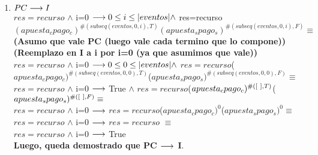 \documentclass[10pt,a4paper]{article}
\begin{document}
\begin{flushleft}
\begin{enumerate} \setlength\itemsep{4mm}
	\item \textbf{$PC \longrightarrow I$} \\
	\vspace{2mm}
	$res= recurso$ $\wedge$ i=0 $\longrightarrow 0\leq i\leq|eventos| \wedge$ res=recurso$(apuesta_cpago_c)^{\#(subseq(eventos,0,i),T)}(apuesta_spago_s)^{\#(subseq(eventos,0,i),F)} \equiv$\\
	\vspace{3mm}
	\textbf{(Asumo que vale PC (luego vale cada termino que lo compone))}\\
	\vspace{3mm}
	\textbf{(Reemplazo en I a i por i=0 (ya que asumimos que vale))}\\
	\vspace{3mm}
	$res= recurso$ $\wedge$ i=0 $\longrightarrow 0\leq 0\leq|eventos| \wedge$ $res=recurso$($apuesta_cpago_c)^{\#(subseq(eventos,0,0),T)}$($apuesta_spago_s)^{\#(subseq(eventos,0,0),F)}\equiv$\\
	\vspace{2mm}
	$res= recurso$ $\wedge$ i=0  $\longrightarrow$  True $ \wedge$ $res=recurso$($apuesta_cpago_c)^{\#([\ ],T)}$($apuesta_spago_s)^{\#([\ ],F)}\equiv$ \\
	\vspace{2mm}
	$res= recurso$ $\wedge$ i=0  $\longrightarrow$ $res=recurso$($apuesta_cpago_c)^{0}$($apuesta_spago_s)^{0} \equiv $\\
	\vspace{2mm}
	$res= recurso$ $\wedge$ i=0  $\longrightarrow$ $res=recurso$ $\equiv $\\
	\vspace{2mm}
	$res= recurso$ $\wedge$ i=0  $\longrightarrow$ True \\
	\vspace{3mm}
	\textbf{Luego, queda demostrado que PC $\longrightarrow$ I}.\\


\end{enumerate}
\end{flushleft}
\end{document}
